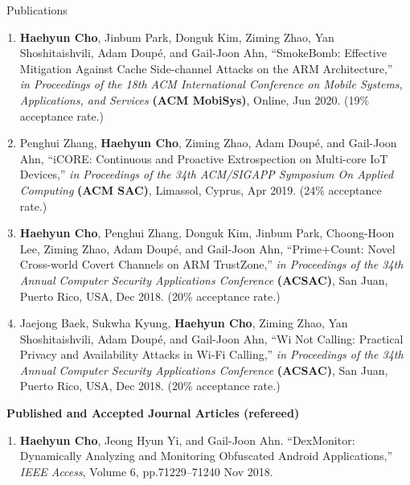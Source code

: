 \documentclass{resume} %
\begin{document}
\begin{rSection}{\faGenderless~Publications}
\begin{enumerate}[leftmargin=0pt]
        \item \textbf{Haehyun Cho}, Jinbum Park, Donguk Kim, Ziming Zhao, Yan Shoshitaishvili, Adam Doup\'e, and Gail-Joon Ahn,
		``SmokeBomb: Effective Mitigation Against Cache Side-channel Attacks on the ARM Architecture,'' 
        \emph{in Proceedings of the 18th ACM International Conference on Mobile Systems, Applications, and Services} \textbf{(ACM MobiSys)}, 
		Online, Jun 2020.
		(19\% acceptance rate.)

		\item Penghui Zhang, \textbf{Haehyun Cho}, Ziming Zhao, Adam Doup\'e, and Gail-Joon Ahn,
		``iCORE: Continuous and Proactive Extrospection on Multi-core IoT Devices,'' 
        \emph{in Proceedings of the 34th ACM/SIGAPP Symposium On Applied Computing} \textbf{(ACM SAC)}, 
		Limassol, Cyprus, Apr 2019.
		(24\% acceptance rate.)
     
        \item \textbf{Haehyun Cho}, Penghui Zhang, Donguk Kim, Jinbum Park, Choong-Hoon Lee, Ziming Zhao, Adam Doup\'e, and Gail-Joon Ahn,
		``Prime+Count: Novel Cross-world Covert Channels on ARM TrustZone,'' 
        \emph{in Proceedings of the 34th Annual Computer Security Applications Conference} \textbf{(ACSAC)}, 
		San Juan, Puerto Rico, USA, Dec 2018.
		(20\% acceptance rate.)

		\item Jaejong Baek, Sukwha Kyung, \textbf{Haehyun Cho}, Ziming Zhao, Yan Shoshitaishvili, Adam Doup\'e, and Gail-Joon Ahn,
		``Wi Not Calling: Practical Privacy and Availability Attacks in Wi-Fi Calling,'' 
        \emph{in Proceedings of the 34th Annual Computer Security Applications Conference} \textbf{(ACSAC)}, 
		San Juan, Puerto Rico, USA, Dec 2018.
		(20\% acceptance rate.)

	\end{enumerate}

	\vspace{3mm}
	
    \strut\textbullet~{\bf Published and Accepted Journal Articles (refereed)}
    \begin{enumerate}[leftmargin=0pt]
		\item \textbf{Haehyun Cho}, Jeong Hyun Yi, and Gail-Joon Ahn.
        ``DexMonitor: Dynamically Analyzing and Monitoring Obfuscated Android Applications,'' 
        \emph{IEEE Access},
        Volume 6, pp.71229--71240
        Nov 2018.


\end{enumerate}
\end{rSection}
\end{document}
